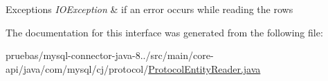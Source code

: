 \begin{DoxyExceptions}{Exceptions}
{\em I\+O\+Exception} & if an error occurs while reading the rows \\
\hline
\end{DoxyExceptions}


The documentation for this interface was generated from the following file\+:\begin{DoxyCompactItemize}
\item 
pruebas/mysql-\/connector-\/java-\/8../src/main/core-\/api/java/com/mysql/cj/protocol/\mbox{\hyperlink{_protocol_entity_reader_8java}{Protocol\+Entity\+Reader.\+java}}\end{DoxyCompactItemize}
